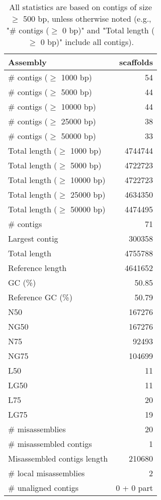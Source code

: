 \documentclass[12pt,a4paper]{article}
\begin{document}
\begin{table}[ht]
\begin{center}
\caption{All statistics are based on contigs of size $\geq$ 500 bp, unless otherwise noted (e.g., "\# contigs ($\geq$ 0 bp)" and "Total length ($\geq$ 0 bp)" include all contigs).}
\begin{tabular}{|l*{1}{|r}|}
\hline
Assembly & scaffolds \\ \hline
\# contigs ($\geq$ 1000 bp) & 54 \\ \hline
\# contigs ($\geq$ 5000 bp) & 44 \\ \hline
\# contigs ($\geq$ 10000 bp) & 44 \\ \hline
\# contigs ($\geq$ 25000 bp) & 38 \\ \hline
\# contigs ($\geq$ 50000 bp) & 33 \\ \hline
Total length ($\geq$ 1000 bp) & 4744744 \\ \hline
Total length ($\geq$ 5000 bp) & 4722723 \\ \hline
Total length ($\geq$ 10000 bp) & 4722723 \\ \hline
Total length ($\geq$ 25000 bp) & 4634350 \\ \hline
Total length ($\geq$ 50000 bp) & 4474495 \\ \hline
\# contigs & 71 \\ \hline
Largest contig & 300358 \\ \hline
Total length & 4755788 \\ \hline
Reference length & 4641652 \\ \hline
GC (\%) & 50.85 \\ \hline
Reference GC (\%) & 50.79 \\ \hline
N50 & 167276 \\ \hline
NG50 & 167276 \\ \hline
N75 & 92493 \\ \hline
NG75 & 104699 \\ \hline
L50 & 11 \\ \hline
LG50 & 11 \\ \hline
L75 & 20 \\ \hline
LG75 & 19 \\ \hline
\# misassemblies & 20 \\ \hline
\# misassembled contigs & 1 \\ \hline
Misassembled contigs length & 210680 \\ \hline
\# local misassemblies & 2 \\ \hline
\# unaligned contigs & 0 + 0 part \\ \hline

\end{tabular}
\end{center}
\end{table}
\end{document}
